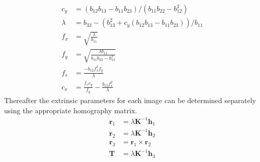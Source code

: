 \documentclass[12pt,oneside,openany,a4paper, %
english, %
masters-t, goldenblock]{usthesis}
\begin{document}
\begin{align}
  c_y &= (b_{12} b_{13} - b_{11} b_{23})/(b_{11} b_{22} - b_{12}^2) \\
  \lambda &= b_{33} -(b_{13}^2 + c_y(b_{12} b_{13} - b_{11} b_{23}))/b_{11}\\
  f_x &= \sqrt{\frac{\lambda}{b_{11}}} \\
  f_y &= \sqrt{\frac{\lambda b_{11}}{b_{11} b_{22} - b_{12}^2}} \\
  f_s &= \frac{-b_{12} f_x^2 f_y}{\lambda} \\
  c_x &= \frac{f_s c_y}{f_y} - \frac{b_{13} f_x^2}{\lambda}
\end{align}
Thereafter the extrinsic parameters for each image can be determined separately using the appropriate homography matrix.
\begin{align}
  \bm{r}_1 &= \lambda \bm{K}^{-1} \bm{h}_1 \\
  \bm{r}_2 &= \lambda \bm{K}^{-1} \bm{h}_2 \\
  \bm{r}_3 &= \bm{r}_1 \times \bm{r}_2 \\
  \bm{T} &= \lambda \bm{K}^{-1} \bm{h}_3
\end{align}




\end{document}
